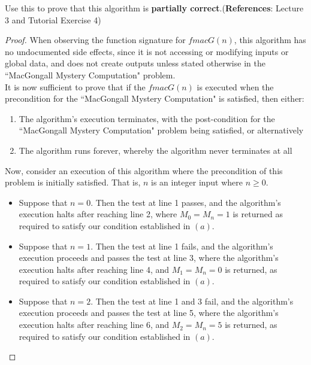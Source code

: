 \documentclass[12pt]{article}
\newenvironment{problem}[2][Problem]{\begin{trivlist}
\item[\hskip \labelsep {\bfseries #1}\hskip \labelsep {\bfseries #2.}]}{\end{trivlist}}
\begin{document}

\begin{problem}{8}
 Use this to prove that this algorithm is \textbf{partially correct}.(\textbf{References}: Lecture 3 and Tutorial Exercise 4)
\end{problem}


\begin{proof}


\noindent
When observing the function signature for $fmacG(n)$, this algorithm has no undocumented side effects, since it is not accessing or modifying inputs or global data, and does not create outputs unless stated otherwise in the ``MacGongall Mystery Computation" problem. \\

\noindent
It is now sufficient to prove that if the $fmacG(n)$ is executed when the precondition for the ``MacGongall Mystery Computation" is satisfied, then either:
\begin{enumerate}[label=(\alph*)]
\item The algorithm's execution terminates, with the post-condition for the ``MacGongall Mystery Computation" problem being satisfied, or alternatively
\item The algorithm runs forever, whereby the algorithm never terminates at all
\end{enumerate}

\noindent
Now, consider an execution of this algorithm where the precondition of this problem is initially satisfied. That is, $n$ is an integer input where $n \geq 0$.

\begin{itemize}

\item Suppose that $n = 0$. Then the test at line 1 passes, and the algorithm's execution halts after reaching line 2, where $M_0 = M_n = 1$ is returned as required to satisfy our condition established in $(a)$.

\item Suppose that $n = 1$. Then the test at line 1 fails, and the algorithm's execution proceeds and passes the test at line 3, where the algorithm's execution halts after reaching line 4, and $M_1 = M_n = 0$ is returned, as required to satisfy our condition established in $(a)$.

\item Suppose that $n = 2$. Then the test at line 1 and 3 fail, and the algorithm's execution proceeds and passes the test at line 5, where the algorithm's execution halts after reaching line 6, and $M_2 = M_n = 5$ is returned, as required to satisfy our condition established in $(a)$.


\end{itemize}
\end{proof}
\end{document}
